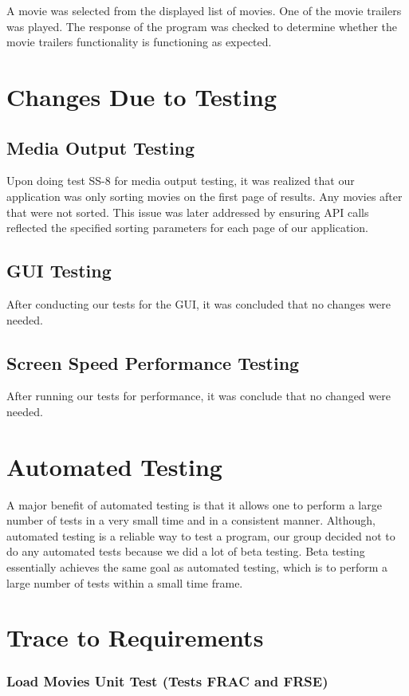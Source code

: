 \documentclass[12pt, titlepage]{article}
\begin{document}
A movie was selected from the displayed list of movies. One of the movie trailers was played. The response of the program was checked to determine whether the movie trailers functionality is functioning as expected.  

\section{Changes Due to Testing}
\subsection{Media Output Testing}
Upon doing test SS-8 for media output testing, it was realized that our application was only sorting movies on the first page of results. Any movies after that were not sorted. This issue was later addressed by ensuring API calls reflected the specified sorting parameters for each page of our application.
\subsection{GUI Testing}
After conducting our tests for the GUI, it was concluded that no changes were needed.
\subsection{Screen Speed Performance Testing}
After running our tests for performance, it was conclude that no changed were needed. 

\section{Automated Testing}
A major benefit of automated testing is that it allows one to perform a large number of tests in a very small time and in a consistent manner. Although, automated testing is a reliable way to test a program, our group decided not to do any automated tests because we did a lot of beta testing. Beta testing essentially achieves the same goal as automated testing, which is to perform a large number of tests within a small time frame.
		
\section{Trace to Requirements}
\subsubsection{Load Movies Unit Test (Tests FRAC and FRSE)}
\end{document}

